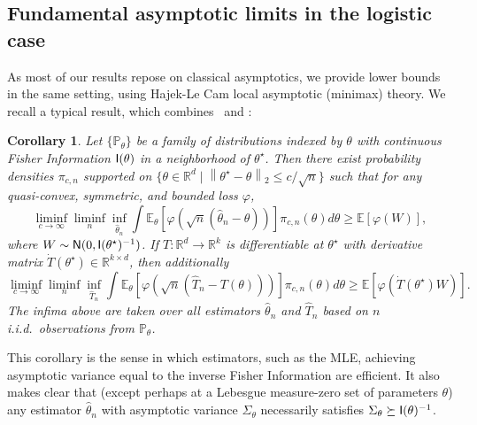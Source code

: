 \documentclass[11pt]{article}
\newcommand{\E}{\mathbb{E}}
\newcommand{\R}{\mathbb{R}} %
\renewcommand{\P}{\mathbb{P}}
\newcommand{\norm}[1]{\left\|{#1}\right\|} %
\newcommand{\what}[1]{\widehat{#1}}
\newcommand{\normal}{\mathsf{N}}
\newcommand{\lr}{^{\textup{lr}}}
\newcommand{\ltwo}[1]{\norm{#1}_2} %
\newcommand{\<}{\langle} %
\renewcommand{\>}{\rangle}
\newcommand{\opt}{^\star}
\newtheorem{corollary}{Corollary}
\begin{document}

\subsection{Fundamental asymptotic limits in the logistic case}
\label{sec:lam-majority-vote}

As most of our results repose on classical asymptotics, we provide lower
bounds in the same setting, using Hajek-Le Cam local asymptotic (minimax)
theory. We recall a typical result, which combines~\citet[Lemma
  6.6.5]{LeCamYa00} and \citet[Theorem 3.11.5]{VanDerVaartWe96}:
\begin{corollary}
  \label{corollary:lam}
  Let $\{\P_\theta\}$ be a family of distributions indexed by $\theta$
  with continuous Fisher Information $\mathsf{I}(\theta)$ in a neighborhood
  of $\theta\opt$.
  Then there exist
  probability densities $\pi_{c,n}$ supported on
  $\{\theta \in \R^d \mid \ltwo{\theta\opt - \theta} \le c/\sqrt{n}\}$
  such that for any quasi-convex, symmetric, and bounded
  loss $\varphi$,
  \begin{equation*}
    \liminf_{c \to \infty}
    \liminf_n \inf_{\what{\theta}_n}
    \int \E_\theta[\varphi(\sqrt{n}(\what{\theta}_n - \theta))]
    \pi_{c,n}(\theta) d\theta
    \ge \E[\varphi(W)],
  \end{equation*}
  where $W \sim \normal(0, \fisher(\theta\opt)^{-1})$.  If $T : \R^d \to
  \R^k$ is differentiable at $\theta\opt$ with derivative matrix
  $\dot{T}(\theta\opt) \in \R^{k \times d}$, then additionally
  \begin{equation*}
    \liminf_{c \to \infty}
    \liminf_n \inf_{\what{T}_n}
    \int \E_\theta[\varphi(\sqrt{n}(\what{T}_n - T(\theta)))]
    \pi_{c,n}(\theta) d\theta
    \ge \E[\varphi(\dot{T}(\theta\opt) W)].
  \end{equation*}
  The infima above are taken over all estimators $\what{\theta}_n$ and
  $\what{T}_n$ based on $n$ i.i.d.\ observations from $\P_\theta$.
\end{corollary}
\noindent
This corollary is the sense in which estimators, such as the MLE, achieving
asymptotic variance equal to the inverse Fisher Information are efficient.
It also makes clear that (except perhaps at a Lebesgue measure-zero set of
parameters $\theta$) any estimator $\what{\theta}_n$ with asymptotic
variance $\Sigma_\theta$ necessarily satisfies
$\Sigma_\theta \succeq \mathsf{I}(\theta)^{-1}$.
\end{document}

